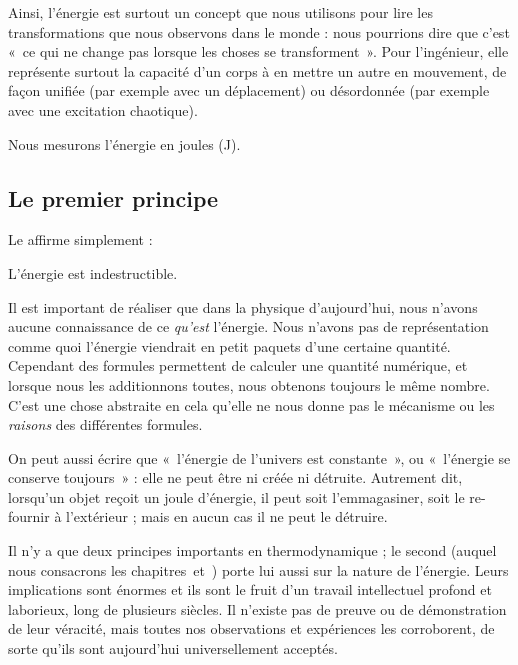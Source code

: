 		Ainsi, l’énergie est surtout un concept que nous utilisons pour lire les transformations que nous observons dans le monde : nous pourrions dire que c’est «~ce qui ne change pas lorsque les choses se transforment~». Pour l’ingénieur, elle représente surtout la capacité d’un corps à en mettre un autre en mouvement, de façon unifiée (par exemple avec un déplacement) ou désordonnée (par exemple avec une excitation chaotique).

		Nous mesurons l’énergie en \si{joules} (\si{\joule}).
	
	\subsection{Le premier principe}
		\label{ch_premier_principe}

		Le  affirme simplement :

		\begin{principe}
				L’énergie est indestructible.
		\end{principe}

			Il est important de réaliser que dans la physique d’aujourd’hui, nous n’avons aucune connaissance de ce \emph{qu’est} l’énergie. Nous n’avons pas de représentation comme quoi l’énergie viendrait en petit paquets d’une certaine quantité. Cependant des formules permettent de calculer une quantité numérique, et lorsque nous les additionnons toutes, nous obtenons toujours le même nombre. C’est une chose abstraite en cela qu’elle ne nous donne pas le mécanisme ou les \emph{raisons} des différentes formules.

		On peut aussi écrire que «~l’énergie de l’univers est constante~», ou «~l’énergie se conserve toujours~» : elle ne peut être ni créée ni détruite. Autrement dit, lorsqu’un objet reçoit un \si{joule} d’énergie, il peut soit l’emmagasiner, soit le re-fournir à l’extérieur ; mais en aucun cas il ne peut le détruire.

		Il n’y a que deux principes importants en thermodynamique ; le second (auquel nous consacrons les chapitres~\sept et~\huit) porte lui aussi sur la nature de l’énergie. Leurs implications sont énormes et ils sont le fruit d’un travail intellectuel profond et laborieux, long de plusieurs siècles. Il n’existe pas de preuve ou de démonstration de leur véracité, mais toutes nos observations et expériences les corroborent, de sorte qu’ils sont aujourd’hui universellement acceptés.
		
